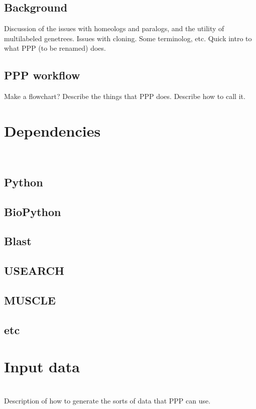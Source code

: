 \documentclass[12pt,letterpaper]{article}
\begin{document}
\subsection{Background} 
Discussion of the issues with homeologs and paralogs, and the utility of 
multilabeled genetrees. Issues with cloning. Some terminolog, etc.
Quick intro to what PPP (to be renamed) does.

\subsection{PPP workflow}
Make a flowchart? Describe the things that PPP does.
Describe how to call it.

\bigskip\section{Dependencies}\\ %
\subsection{Python}

\subsection{BioPython}

\subsection{Blast}

\subsection{USEARCH}

\subsection{MUSCLE}

\subsection{etc}

\bigskip\section{Input data}\\
Description of how to generate the sorts of data that PPP can use.
\end{document}
